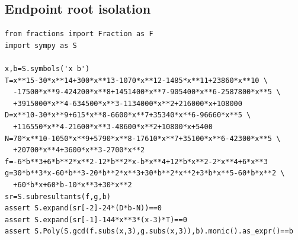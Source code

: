 \documentclass[11pt]{article}
\begin{document}
\subsection{Endpoint root isolation}
\begin{verbatim}
from fractions import Fraction as F
import sympy as S

x,b=S.symbols('x b')
T=x**15-30*x**14+300*x**13-1070*x**12-1485*x**11+23860*x**10 \
  -17500*x**9-424200*x**8+1451400*x**7-905400*x**6-2587800*x**5 \
  +3915000*x**4-634500*x**3-1134000*x**2+216000*x+108000
D=x**10-30*x**9+615*x**8-6600*x**7+35340*x**6-96660*x**5 \
  +116550*x**4-21600*x**3-48600*x**2+10800*x+5400
N=70*x**10-1050*x**9+5790*x**8-17610*x**7+35100*x**6-42300*x**5 \
  +20700*x**4+3600*x**3-2700*x**2
f=-6*b**3+6*b**2*x**2-12*b**2*x-b*x**4+12*b*x**2-2*x**4+6*x**3
g=30*b**3*x-60*b**3-20*b**2*x**3+30*b**2*x**2+3*b*x**5-60*b*x**2 \
  +60*b*x+60*b-10*x**3+30*x**2
sr=S.subresultants(f,g,b)
assert S.expand(sr[-2]-24*(D*b-N))==0
assert S.expand(sr[-1]-144*x**3*(x-3)*T)==0
assert S.Poly(S.gcd(f.subs(x,3),g.subs(x,3)),b).monic().as_expr()==b


\end{verbatim}
\end{document}
